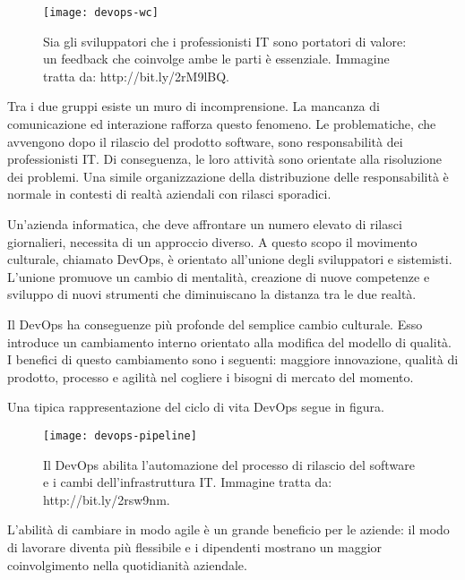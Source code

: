 \begin{figure}[htbp]
	\begin{center}
		\texttt{[image: devops-wc]}
		\caption{Sia gli sviluppatori che i professionisti IT sono portatori di valore: 
	    un feedback che coinvolge ambe le parti è essenziale. Immagine tratta 
		da: http://bit.ly/2rM9lBQ.}
	\end{center}
\end{figure}


Tra i due gruppi esiste un muro di incomprensione. La mancanza di comunicazione ed 
interazione rafforza questo fenomeno. Le problematiche, che avvengono dopo il rilascio del prodotto 
software, sono responsabilità dei professionisti IT. Di conseguenza, le loro attività 
sono orientate alla risoluzione dei problemi. Una simile organizzazione della distribuzione 
delle responsabilità è normale in contesti di realtà aziendali con rilasci sporadici.  

Un'azienda informatica, che deve affrontare un numero elevato di rilasci giornalieri, 
necessita di un approccio diverso. A questo scopo il movimento culturale, 
chiamato DevOps, è orientato all'unione degli sviluppatori e sistemisti. 
L'unione promuove un cambio di mentalità, creazione di nuove competenze e 
sviluppo di nuovi strumenti che diminuiscano la distanza tra le due realtà. 

Il DevOps ha conseguenze più profonde del semplice cambio culturale.  
Esso introduce un cambiamento interno orientato alla modifica del modello 
di qualità. I benefici di questo cambiamento sono i seguenti: maggiore 
innovazione, qualità di prodotto, processo e agilità nel cogliere i bisogni di mercato del momento.

Una tipica rappresentazione del ciclo di vita DevOps segue in figura. 

\begin{figure}[htbp]
	\begin{center}
		\texttt{[image: devops-pipeline]}
		\caption{Il DevOps abilita l'automazione del processo di rilascio del software e i cambi dell'infrastruttura IT. Immagine tratta da: http://bit.ly/2rsw9nm.}
	\end{center}
\end{figure}

L'abilità di cambiare in modo agile è un grande beneficio per le aziende: il modo di lavorare diventa più flessibile e i dipendenti mostrano un maggior coinvolgimento nella quotidianità aziendale.    


